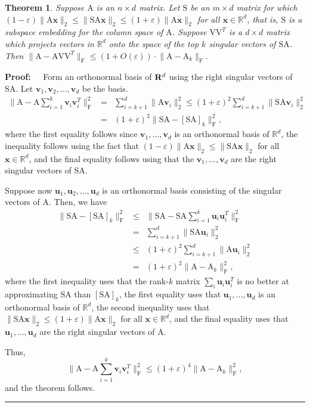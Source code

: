 \documentclass[11pt]{article}
\newcommand{\FNorm }[1]{\mbox{}\|#1\|_\mathrm{F}  }
\newcommand{\FNormS}[1]{\mbox{}\|#1\|_\mathrm{F}^2}
\newtheorem{theorem}{Theorem}
\newenvironment{proof}{\begin{trivlist} \item {\bf Proof:~~}}
  {\qed\end{trivlist}}
\newcommand{\mat}[1]{{\ensuremath{\bm{\mathrm{#1}}}}}
\def\u{{\mathbf u}}
\def\ve{{\mathbf v}}
\def\matA{\mat{A}}
\def\matS{\mat{S}}
\def\matV{\mat{V}}
\def\qed{\hfill\rule{2mm}{2mm}}
\def\x{{\mathbf x}}
\newcommand{\eps}{\varepsilon}
\begin{document}
\begin{theorem}\label{thm:kv}
Suppose $\matA$ is an $n \times d$ matrix. Let $\matS$ be an $m \times d$ matrix for which
$(1-\eps)\|\matA\x\|_2 \leq \|\matS\matA\x\|_2 \leq (1+\eps)\|\matA\x\|_2$ for all $\x \in \mathbb{R}^d$, that is,
$\matS$ is a subspace embedding for the column space of $\matA$. Suppose
$\matV\matV^T$ is a $d \times d$ matrix which projects vectors in $\mathbb{R}^d$ onto the space of
the top $k$
singular vectors of $\matS\matA$. Then
$\FNorm{\matA-\matA\matV\matV^T} \leq (1+O(\eps))\cdot \FNorm{\matA-\matA_k}.$
\end{theorem}
\begin{proof}
Form an orthonormal basis of ${\bf R}^d$ using the right singular vectors of $\matS\matA$. Let
$\ve_1,\ve_2,\ldots ,\ve_d$ be the basis.
\begin{eqnarray*}
\FNormS{\matA-\matA\sum_{i=1}^k\ve_i\ve_i^T}&=& \sum_{i=k+1}^d \|\matA\ve_i\|_2^2
\leq (1+\eps)^2\sum_{i=k+1}^d\|\matS\matA\ve_i\|_2^2\\
&= & (1+\eps)^2\FNormS{\matS\matA-[\matS\matA]_k},
\end{eqnarray*}
where the first equality follows since $\ve_1, \ldots, \ve_d$ is an orthonormal basis
of $\mathbb{R}^d$,
the inequality follows using the fact that $(1-\eps)\|\matA \x\|_2 \leq \|\matS \matA \x\|_2$
for all $\x \in \mathbb{R}^d$, and the final equality follows using that the $\ve_1, \ldots, \ve_d$
are the right singular vectors of $\matS \matA$. 

Suppose now $\u_1,\u_2,\ldots ,\u_d$ is an orthonormal basis consisting of the singular vectors
of $\matA$. Then, we have
\begin{eqnarray*}
\FNormS{\matS\matA-[\matS\matA]_k} &\leq & \FNormS{\matS\matA-\matS\matA\sum_{i=1}^k\u_i\u_i^T}\\
& = &\sum_{i=k+1}^d \|\matS\matA\u_i\|_2^2\\
&\leq & (1+\varepsilon )^2\sum_{i=k+1}^d\|\matA\u_i\|_2^2\\
& = &(1+\eps)^2\FNormS{\matA-\matA_k},
\end{eqnarray*}
where the first inequality uses that the rank-$k$ matrix $\sum_i \u_i \u_i^T$ is no better
at approximating $\matS \matA$ than $[\matS\matA]_k$, the first equality uses that
$\u_1, \ldots, \u_d$ is an orthonormal basis of $\mathbb{R}^d$, the second inequality uses
that $\|\matS \matA \x \|_2 \leq (1+\eps)\|\matA \x\|_2$ for all $\x \in \mathbb{R}^d$, 
and the final equality uses that $\u_1, \ldots, \u_d$ are the right singular vectors of $\matA$. 

Thus,
\[
\FNormS{\matA - \matA \sum_{i=1}^k \ve_i \ve_i^T} \le (1+\eps)^4 \FNormS{\matA-\matA_k},
\]
and the theorem follows.
\end{proof}
\end{document}
